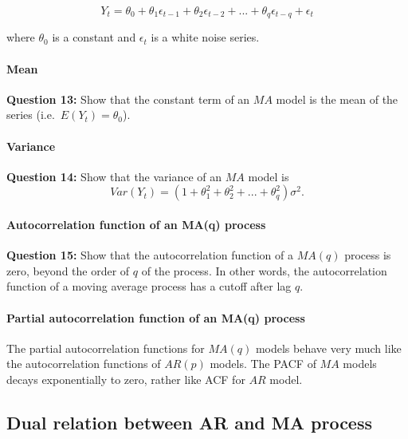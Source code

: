 \documentclass[]{book}
\let\oldparagraph\paragraph
\renewcommand{\paragraph}[1]{\oldparagraph{#1}\mbox{}}
\begin{document}
\begin{equation}
  \label{eq:ma2}
Y_t = \theta_0 + \theta_1 \epsilon_{t-1} + \theta_2 \epsilon_{t-2} +...+ \theta_q \epsilon_{t-q} +\epsilon_t
\end{equation}

where \(\theta_0\) is a constant and \({\epsilon_t}\) is a white noise series.

\hypertarget{mean-5}{%
\paragraph{Mean}\label{mean-5}}

\textbf{Question 13:} Show that the constant term of an \(MA\) model is the mean of the series (i.e.~\(E(Y_t)=\theta_0\)).

\hypertarget{variance-4}{%
\paragraph{Variance}\label{variance-4}}

\textbf{Question 14:} Show that the variance of an \(MA\) model is
\[Var(Y_t)=(1+\theta_1^2+\theta_2^2+...+\theta_q^2)\sigma^2.\]

\hypertarget{autocorrelation-function-of-an-maq-process}{%
\paragraph{Autocorrelation function of an MA(q) process}\label{autocorrelation-function-of-an-maq-process}}

\textbf{Question 15:} Show that the autocorrelation function of a \(MA(q)\) process is zero, beyond the order of \(q\) of the process. In other words, the autocorrelation function of a moving average process has a cutoff after lag \(q\).

\hypertarget{partial-autocorrelation-function-of-an-maq-process}{%
\paragraph{Partial autocorrelation function of an MA(q) process}\label{partial-autocorrelation-function-of-an-maq-process}}

The partial autocorrelation functions for \(MA(q)\) models behave very much like the autocorrelation functions of \(AR(p)\) models. The PACF of \(MA\) models decays exponentially to zero, rather like ACF for \(AR\) model.

\hypertarget{dual-relation-between-ar-and-ma-process}{%
\subsection{Dual relation between AR and MA process}\label{dual-relation-between-ar-and-ma-process}}
\end{document}
